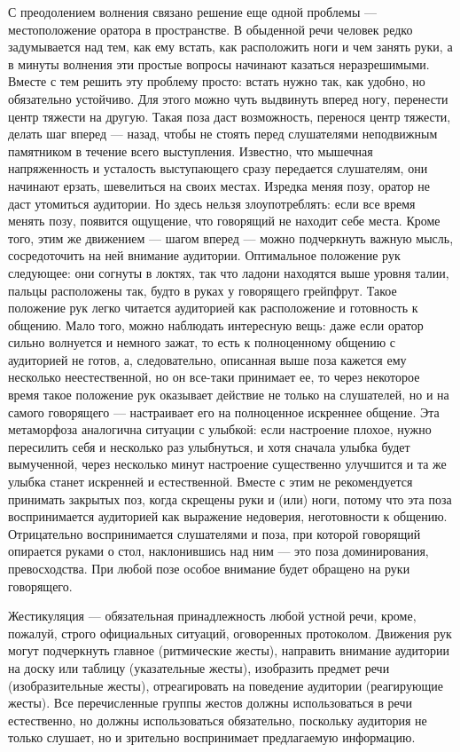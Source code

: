 С преодолением волнения связано решение еще одной проблемы — местоположение оратора в пространстве. 
В обыденной речи человек редко задумывается над тем, как ему встать, как расположить ноги и чем занять руки, а в
минуты волнения эти простые вопросы начинают казаться неразрешимыми. 
Вместе с тем решить эту проблему просто: встать нужно так, как удобно, но обязательно устойчиво. 
Для этого можно чуть выдвинуть вперед ногу, перенести центр тяжести на другую. 
Такая поза даст возможность, перенося центр тяжести, делать шаг вперед — назад, чтобы не стоять перед слушателями неподвижным памятником в течение всего выступления. Известно, что мышечная напряженность и усталость выступающего сразу передается слушателям, они начинают ерзать, шевелиться на своих местах. 
Изредка меняя позу, оратор не даст утомиться аудитории. 
Но здесь нельзя злоупотреблять: если все время менять позу, появится ощущение, что говорящий не находит себе места. Кроме того, этим же движением — шагом вперед — можно подчеркнуть важную мысль, сосредоточить на ней внимание аудитории. 
Оптимальное положение рук следующее: они согнуты в локтях, так что ладони находятся выше уровня талии, пальцы расположены так, будто в руках у говорящего грейпфрут. Такое положение рук легко читается аудиторией как расположение и готовность к общению. Мало того, можно наблюдать интересную вещь: даже если оратор сильно волнуется и немного зажат, то есть к полноценному общению с аудиторией не готов, а, следовательно, описанная выше поза кажется ему несколько неестественной, но он все-таки принимает ее, то через некоторое время такое положение рук
оказывает действие не только на слушателей, но и на самого говорящего — настраивает его на полноценное искреннее общение. 
Эта метаморфоза аналогична ситуации с улыбкой: если настроение плохое, нужно пересилить себя и несколько раз улыбнуться, и хотя сначала улыбка будет вымученной, через несколько минут настроение существенно улучшится и та же улыбка станет искренней и естественной. 
Вместе с этим не рекомендуется принимать закрытых поз, когда скрещены руки и (или) ноги, потому что эта поза воспринимается аудиторией как выражение недоверия, неготовности к общению. 
Отрицательно воспринимается слушателями и поза, при которой говорящий опирается руками о стол, наклонившись над ним — это поза доминирования, превосходства. 
При любой позе особое внимание будет обращено на руки говорящего. 

Жестикуляция — обязательная принадлежность любой устной речи, кроме, пожалуй, строго официальных ситуаций, оговоренных протоколом. 
Движения рук могут подчеркнуть главное (ритмические жесты), направить внимание аудитории на доску или таблицу (указательные жесты), изобразить предмет речи (изобразительные жесты), отреагировать на поведение аудитории (реагирующие жесты). 
Все перечисленные группы жестов должны использоваться в речи естественно, но должны использоваться обязательно, поскольку аудитория не только слушает, но и зрительно воспринимает предлагаемую информацию. 

